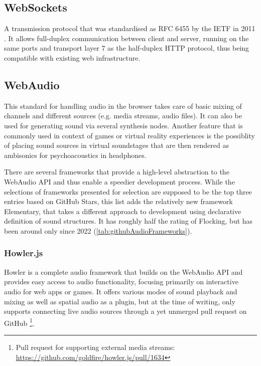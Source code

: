 \subsection{WebSockets}

A transmission protocol that was standardised as \ac{RFC} 6455 by the \ac{IETF} in 2011 \parencite{webSocketsProtocolRfc}. It allows full-duplex communication between client and server, running on the same ports and transport layer 7 as the half-duplex \ac{HTTP} protocol, thus being compatible with existing web infrastructure.

\subsection{WebAudio}

This standard for handling audio in the browser takes care of basic mixing of channels and different sources (e.g. media streams, audio files). It can also be used for generating sound via several synthesis nodes. Another feature that is commonly used in context of games or virtual reality experiences is the possiblity of placing sound sources in virtual soundstages that are then rendered as ambisonics for psychoacoustics in headphones.

There are several frameworks that provide a high-level abstraction to the WebAudio \ac{API} and thus enable a speedier development process. While the selections of frameworks presented for selection are supposed to be the top three entries based on GitHub Stars, this list adds the relatively new framework Elementary, that takes a different approach to development using declarative definition of sound structures. It has roughly half the rating of Flocking, but has been around only since 2022 (\ref{tab:githubAudioFrameworks}).



\subsubsection{Howler.js}

Howler is a complete audio framework that builds on the WebAudio \ac{API} and provides easy access to audio functionality, focusing primarily on interactive audio for web apps or games. It offers various modes of sound playback and mixing as well as spatial audio as a plugin, but at the time of writing, only supports connecting live audio sources through a yet unmerged pull request on GitHub \footnote{Pull request for supporting external media streams: \href{https://github.com/goldfire/howler.js/pull/1634}{https://github.com/goldfire/howler.js/pull/1634}}.


